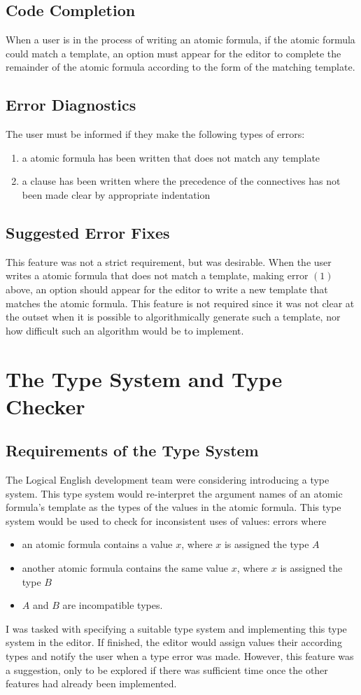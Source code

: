 \documentclass[../main.tex]{subfiles}
\begin{document}
\subsection{Code Completion}
When a user is in the process of writing an atomic formula, if the atomic formula could match a template, an option must appear for the editor to complete the remainder of the atomic formula according to the form of the matching template.

\subsection{Error Diagnostics}
The user must be informed if they make the following types of errors:
\begin{enumerate}
    \item a atomic formula has been written that does not match any template 
    \item a clause has been written where the precedence of the connectives has not been made clear by appropriate indentation
\end{enumerate}

\subsection{Suggested Error Fixes}
This feature was not a strict requirement, but was desirable. When the user writes a atomic formula that does not match a template, making error $(1)$ above, an option should appear for the editor to write a new template that matches the atomic formula. This feature is not required since it was not clear at the outset when it is possible to algorithmically generate such a template, nor how difficult such an algorithm would be to implement.

\section{The Type System and Type Checker}
\subsection{Requirements of the Type System}
The Logical English development team were considering introducing a type system. This type system would re-interpret the argument names of an atomic formula's template as the types of the values in the atomic formula. This type system would be used to check for inconsistent uses of values: errors where
\begin{itemize}
    \item an atomic formula contains a value $x$, where $x$ is assigned the type $A$
    \item another atomic formula contains the same value $x$, where $x$ is assigned the type $B$
    \item $A$ and $B$ are incompatible types.
\end{itemize}
I was tasked with specifying a suitable type system and implementing this type system in the editor. If finished, the editor would assign values their according types and notify the user when a type error was made. However, this feature was a suggestion, only to be explored if there was sufficient time once the other features had already been implemented. 
\end{document}
